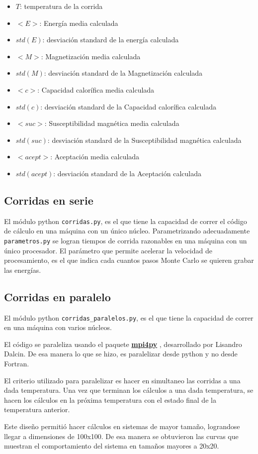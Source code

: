 \begin{itemize}
  \item $T$: temperatura de la corrida 
    \item $<E>$: Energ\'ia media calculada
    \item  $std(E)$: desviaci\'on standard de la energ\'ia calculada

    \item $<M>$: Magnetizaci\'on media calculada
    \item  $std(M)$: desviaci\'on standard de la Magnetizaci\'on calculada


    \item $<c>$: Capacidad calor\'ifica media calculada
    \item  $std(c)$: desviaci\'on standard de la Capacidad calor\'ifica calculada

    \item $<suc>$: Susceptibilidad magn\'etica media calculada
    \item  $std(suc)$: desviaci\'on standard de la Susceptibilidad magn\'etica calculada


    \item $<acept>$: Aceptaci\'on media calculada
    \item  $std(acept)$: desviaci\'on standard de la Aceptaci\'on calculada
\end{itemize}


\subsection{Corridas en serie}\label{serie}
El módulo python \texttt{corridas.py}, es el que tiene la capacidad de correr
el código de cálculo en una máquina con un único núcleo. Parametrizando 
adecuadamente \texttt{parametros.py} se logran tiempos de corrida razonables en 
una máquina con un único procesador. El parámetro que permite acelerar la 
velocidad de procesamiento, es el que indica cada cuantos pasos Monte Carlo se 
quieren grabar las energías.

\subsection{Corridas en paralelo}\label{paralelo}

El módulo python \texttt{corridas\_paralelos.py}, es el que tiene la capacidad 
de correr en una máquina con varios núcleos.

El código se paraleliza usando el paquete \href{http://mpi4py.scipy.org/} {\textbf{mpi4py}} ,  desarrollado por Lisandro Dalcin.
De esa manera lo que se hizo, es paralelizar desde python y no desde Fortran.

El criterio utilizado para paralelizar es hacer en simultaneo  las corridas a 
una dada temperatura. 
Una vez que terminan los cálculos a una dada temperatura, se hacen los cálculos 
en la próxima temperatura con el estado final de la temperatura anterior.

Este diseño permitió hacer cálculos en sistemas de mayor tamaño, lograndose llegar a dimensiones
de 100x100. De esa manera se obtuvieron las curvas que muestran el comportamiento del sistema en
tamaños mayores a 20x20.
